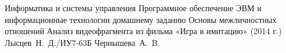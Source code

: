 \documentclass{bmstu}
\begin{document}
\makereporttitle
{Информатика и системы управления} %
{Программное обеспечение ЭВМ и информационные технологии}
{домашнему заданию} %
{Основы межличностных отношений} %
{Анализ видеофрагмента из фильма «Игра в имитацию» (2014 г.)} %
{} %
{Лысцев~Н.~Д./ИУ7-63Б} %
{Чернышева~А.~B.} %
{}


%
%
%
%
%

\end{document}
